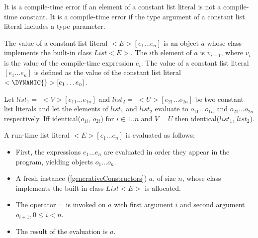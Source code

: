 \documentclass{article}
\newcommand{\code}[1]{{\sf #1}}
\begin{document}
\LMHash{}
It is a compile-time error if an element of a constant list literal is not a compile-time constant. It is a compile-time error if the type argument of a constant list literal includes a type parameter.

\LMHash{}
The value of a constant list literal  \CONST{} $<E>[e_1\ldots e_n]$ is an object $a$ whose class implements the built-in class $List<E>$. The $i$th element of $a$ is $v_{i+1}$, where $v_i$ is the value of the compile-time expression $e_i$.  The value of a constant list literal  \CONST{} $[e_1 \ldots e_n]$ is defined as the value of the constant list literal \CONST{}$ < \DYNAMIC{}>[e_1\ldots e_n]$.

\LMHash{}
Let $list_1 =$ \CONST{} $<V>[e_{11} \ldots e_{1n}]$ and $list_2 =$  \CONST{} $<U>[e_{21} \ldots e_{2n}]$ be two constant list literals and let the  elements of $list_1$ and $list_2$  evaluate to  $o_{11} \ldots o_{1n}$ and $o_{21} \ldots o_{2n}$ respectively. Iff \code{identical($o_{1i}$, $o_{2i}$)} for $i \in 1.. n$ and $V = U$ then \code{identical($list_1$, $list_2$)}. 


\LMHash{}
A run-time list literal $<E>[e_1 \ldots e_n]$  is evaluated as follows:
\begin{itemize}
\item
First, the expressions $e_1 \ldots e_n$ are evaluated in order they appear in the program, yielding objects $o_1 \ldots o_n$.
\item A fresh instance  (\ref{generativeConstructors}) $a$, of size $n$,  whose class implements the built-in class $List<E>$ is allocated. 
\item
The operator \code{[]=} is invoked on $a$ with  first  argument $i$ and second argument
$o_{i+1}, 0 \le i < n$.
\item
The result of the evaluation is $a$.
\end{itemize}


\end{document}

